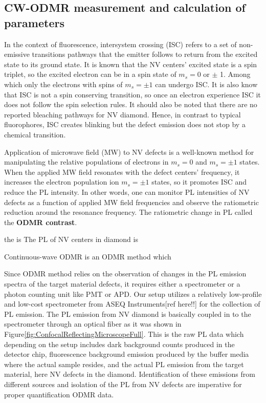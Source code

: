 \subsection{CW-ODMR measurement and calculation of parameters}
In the context of fluorescence, intersystem crossing (ISC) refers to a set of
non-emissive transitions pathways that the emitter follows to return from the 
excited state to its ground state. It is known that the NV centers' excited state 
is a spin triplet, so the excited electron can be in a spin state of $m_{s} = 0$ 
or $\pm$ 1. Among which only the electrons with spins of $m_{s} = \pm 1$ can
undergo ISC. It is also know that ISC is not a spin conserving transition, so 
once an electron experience ISC it does not follow the spin selection rules.
It should also be noted that there are no reported bleaching pathways for NV diamond.
Hence, in contrast to typical fluorophores, ISC creates blinking but the defect 
emission does not stop by a chemical transition. 

Application of microwave field (MW) to NV defects is a well-known method for manipulating
the relative populations of electrons in $m_{s} = 0$ and $m_{s} = \pm 1$ states. When 
the applied MW field resonates with the defect centers' frequency, it increases the 
electron population ion $m_{s} = \pm 1$ states, so it promotes ISC and reduce the 
PL intensity. In other words, one can monitor PL intensities of NV defects as a 
function of applied MW field frequencies and observe the ratiometric reduction around 
the resonance frequency. The ratiometric change in PL called the \textbf{ODMR contrast}. 


 

the is The PL of NV centers in diamond is 

Continuous-wave ODMR is an ODMR method which 


Since ODMR method relies on the observation of changes in the PL emission 
spectra of the target material defects, it requires either a spectrometer 
or a photon counting unit like PMT or APD. Our setup utilizes a relatively 
low-profile and low-cost spectrometer from ASEQ Instruments[ref here!!] for
the collection of PL emission. The PL emission from NV diamond is basically  
coupled in to the spectrometer through an optical fiber as it was shown in 
Figure\ref{fig:ConfocalReflectingMicroscopeFull}. This is the raw PL data 
which depending on the setup includes dark background counts produced in the
detector chip, fluorescence background emission produced by the buffer media
where the actual sample resides, and the actual PL emission from the target
material, here NV defects in the diamond. Identification of these emissions 
from different sources and isolation of the PL from NV defects are imperative
for proper quantification ODMR data.

